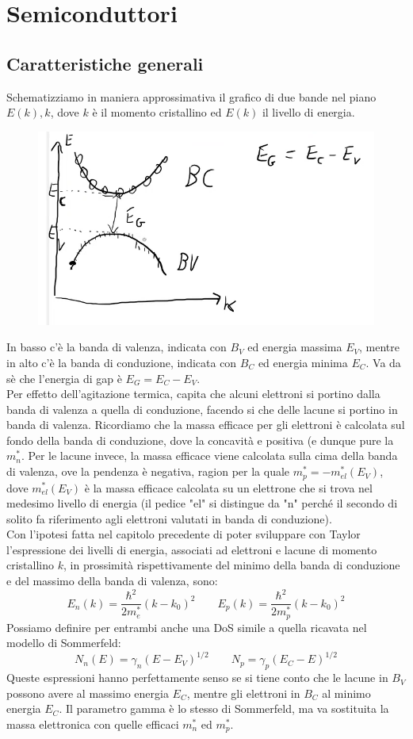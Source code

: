 \documentclass{book}
\begin{document}
\chapter{Semiconduttori}
    \section{Caratteristiche generali}
        Schematizziamo in maniera approssimativa il grafico di due bande nel piano $E(k), k$, dove $k$ è il momento cristallino ed $E(k)$ il livello di energia.
        \begin{figure}[h!]
            \centering
            \includegraphics[width=0.5\linewidth]{img/radio4.png}
        \end{figure}
        In basso c'è la banda di valenza, indicata con $B_{V}$ ed energia massima $E_{V}$, mentre in alto c'è la banda di conduzione, indicata con $B_{C}$ ed energia minima $E_{C}$. Va da sè che l'energia di gap è $E_{G} = E_{C} - E_{V}$.\\
        Per effetto dell'agitazione termica, capita che alcuni elettroni si portino dalla banda di valenza a quella di conduzione, facendo si che delle lacune si portino in banda di valenza. Ricordiamo che la massa efficace per gli elettroni è calcolata sul fondo della banda di conduzione, dove la concavità e positiva (e dunque pure la $m^{*}_{n}$. Per le lacune invece, la massa efficace viene calcolata sulla cima della banda di valenza, ove la pendenza è negativa, ragion per la quale $m^{*}_{p} = - m_{el}^{*}(E_{V})$, dove $m_{el}^{*}(E_{V})$ è la massa efficace calcolata su un elettrone che si trova nel medesimo livello di energia (il pedice "el" si distingue da "n" perché il secondo di solito fa riferimento agli elettroni valutati in banda di conduzione).\\
        Con l'ipotesi fatta nel capitolo precedente di poter sviluppare con Taylor l'espressione dei livelli di energia, associati ad elettroni e lacune di momento cristallino $k$, in prossimità rispettivamente del minimo della banda di conduzione e del massimo della banda di valenza, sono:
        $$E_{n}(k) = \frac{\hbar ^{2}}{2m_{e} ^{*}}(k-k_{0})^{2} \qquad E_{p}(k) = \frac{\hbar ^{2}}{2m_{p} ^{*}}(k-k_{0})^{2}$$
        Possiamo definire per entrambi anche una DoS simile a quella ricavata nel modello di Sommerfeld:
        $$N_{n}(E) = \gamma_{n}(E-E_{V})^{1/2} \qquad N_{p} = \gamma_{p}(E_{C}-E)^{1/2}$$
        Queste espressioni hanno perfettamente senso se si tiene conto che le lacune in $B_{V}$ possono avere al massimo energia $E_{C}$, mentre gli elettroni in $B_{C}$ al minimo energia $E_{C}$.
        Il parametro gamma è lo stesso di Sommerfeld, ma va sostituita la massa elettronica con quelle efficaci $m_{n} ^{*}$ ed $m_{p} ^{*}$.
\end{document}
